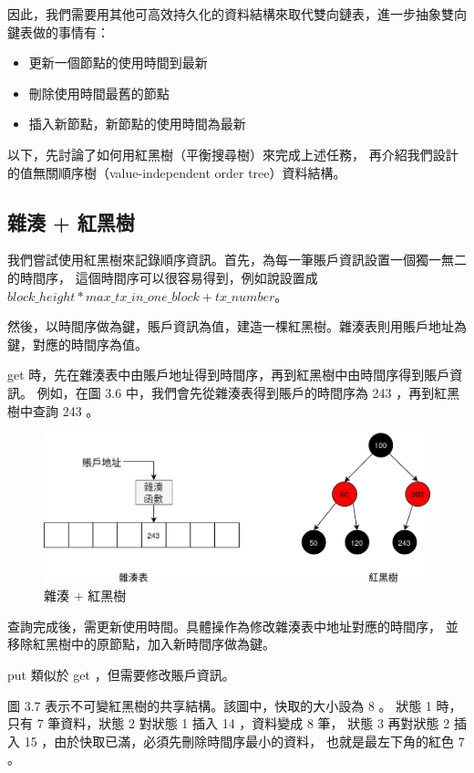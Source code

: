 因此，我們需要用其他可高效持久化的資料結構來取代雙向鏈表，進一步抽象雙向鍵表做的事情有：

\begin{itemize}
  \item 更新一個節點的使用時間到最新
  \item 刪除使用時間最舊的節點
  \item 插入新節點，新節點的使用時間為最新
\end{itemize}

以下，先討論了如何用紅黑樹\cite{guibas1978dichromatic}（平衡搜尋樹）來完成上述任務，
再介紹我們設計的值無關順序樹（value-independent order tree）資料結構。

\subsection{雜湊 + 紅黑樹}

我們嘗試使用紅黑樹來記錄順序資訊。首先，為每一筆賬戶資訊設置一個獨一無二的時間序，
這個時間序可以很容易得到，例如說設置成 $block\_height * max\_tx\_in\_one\_block + tx\_number$。

然後，以時間序做為鍵，賬戶資訊為值，建造一棵紅黑樹。雜湊表則用賬戶地址為鍵，對應的時間序為值。

get 時，先在雜湊表中由賬戶地址得到時間序，再到紅黑樹中由時間序得到賬戶資訊。
例如，在圖 3.6 中，我們會先從雜湊表得到賬戶的時間序為 243 ，再到紅黑樹中查詢 243 。

\begin{figure}[h!]
\includegraphics[width=\textwidth]{雜湊紅黑樹}
\caption{雜湊 + 紅黑樹}
\end{figure}

查詢完成後，需更新使用時間。具體操作為修改雜湊表中地址對應的時間序，
並移除紅黑樹中的原節點，加入新時間序做為鍵。

put 類似於 get ，但需要修改賬戶資訊。

圖 3.7 表示不可變紅黑樹的共享結構。該圖中，快取的大小設為 8 。
狀態 1 時，只有 7 筆資料，狀態 2 對狀態 1 插入 14 ，資料變成 8 筆，
狀態 3 再對狀態 2 插入 15 ，由於快取已滿，必須先刪除時間序最小的資料，
也就是最左下角的紅色 7 。

